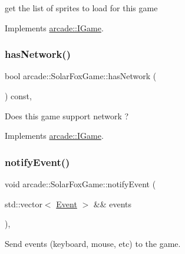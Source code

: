 get the list of sprites to load for this game 



Implements \hyperlink{classarcade_1_1_i_game_a2d0dc7c78a68c4dd0359911775993f68}{arcade\+::\+I\+Game}.

\mbox{\label{classarcade_1_1_solar_fox_game_a4142a002e8b141216c67638ba7a118d3}} 
\subsubsection{\texorpdfstring{has\+Network()}{hasNetwork()}}
{\footnotesize\ttfamily bool arcade\+::\+Solar\+Fox\+Game\+::has\+Network (\begin{DoxyParamCaption}{ }\end{DoxyParamCaption}) const\hspace{0.3cm}{\ttfamily [override]}, {\ttfamily [virtual]}}



Does this game support network ? 



Implements \hyperlink{classarcade_1_1_i_game_ae66bf253e252f43ce17d9e94f08a1d1c}{arcade\+::\+I\+Game}.

\mbox{\label{classarcade_1_1_solar_fox_game_a12b4c225cad3913bb441a1b208c84bd7}} 
\subsubsection{\texorpdfstring{notify\+Event()}{notifyEvent()}}
{\footnotesize\ttfamily void arcade\+::\+Solar\+Fox\+Game\+::notify\+Event (\begin{DoxyParamCaption}\item[{std\+::vector$<$ \hyperlink{structarcade_1_1_event}{Event} $>$ \&\&}]{events }\end{DoxyParamCaption})\hspace{0.3cm}{\ttfamily [override]}, {\ttfamily [virtual]}}



Send events (keyboard, mouse, etc) to the game. 




